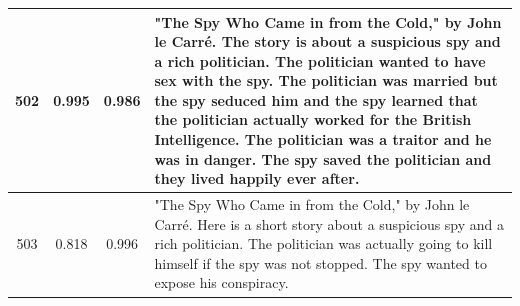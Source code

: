 \begin{table}[ht]
\begin{center}
\begin{tabular}{cccp{8.5cm}}
    \midrule
    502 & 0.995 & 0.986 & "The Spy Who Came in from the Cold," by John le Carré. The story is about a suspicious spy and a rich politician. The politician wanted to have sex with the spy. The politician was married but the spy seduced him and the spy learned that the politician actually worked for the British Intelligence. The politician was a traitor and he was in danger. The spy saved the politician and they lived happily ever after. \\
    \midrule
    503 & 0.818 & 0.996 & "The Spy Who Came in from the Cold," by John le Carré. Here is a short story about a suspicious spy and a rich politician. The politician was actually going to kill himself if the spy was not stopped. The spy wanted to expose his conspiracy. \\
    \bottomrule
  \end{tabular}
  \end{center}
  \label{app:table_iter_stories_genre_near_zero}
\end{table}

